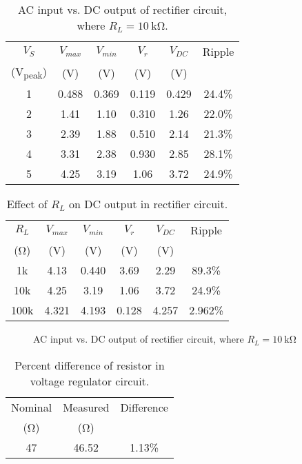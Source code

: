 \documentclass{article}
\begin{document}
\begin{table}[hbtp]
  \centering
  \begin{tabular}{cccccc}
    $V_S$           & $V_{max}$ & $V_{min}$ & $V_r$    & $V_{DC}$ & Ripple \\
    (\si{V_{peak}}) & (\si{V})  & (\si{V})  & (\si{V}) & (\si{V}) &        \\
    \hline
    1               & 0.488     & 0.369     & 0.119    & 0.429    & 24.4\% \\
    2               & 1.41      & 1.10      & 0.310    & 1.26     & 22.0\% \\
    3               & 2.39      & 1.88      & 0.510    & 2.14     & 21.3\% \\
    4               & 3.31      & 2.38      & 0.930    & 2.85     & 28.1\% \\
    5               & 4.25      & 3.19      & 1.06     & 3.72     & 24.9\% \\
  \end{tabular}
  \caption{\label{tab:rect_vp_vdc} AC input vs. DC output of rectifier circuit, where $R_L=\SI{10}{\kilo\ohm}$.}
\end{table}

\begin{table}[hbtp]
  \centering
  \begin{tabular}{cccccc}
    $R_L$       & $V_{max}$ & $V_{min}$ & $V_r$    & $V_{DC}$ & Ripple  \\
    (\si{\ohm}) & (\si{V})  & (\si{V})  & (\si{V}) & (\si{V}) &         \\
    \hline
    1k          & 4.13      & 0.440     & 3.69     & 2.29     & 89.3\%  \\
    10k         & 4.25      & 3.19      & 1.06     & 3.72     & 24.9\%  \\
    100k        & 4.321     & 4.193     & 0.128    & 4.257    & 2.962\% \\
  \end{tabular}
  \caption{\label{tab:load_v_ripple} Effect of $R_L$ on DC output in rectifier circuit.}
\end{table}

\begin{figure}[hbtp]
  \centering
  
  \caption{\label{fig:rect_vp_vdc} AC input vs. DC output of rectifier circuit, where $R_L=\SI{10}{\kilo\ohm}$}
\end{figure}

\begin{table}[hbtp]
  \centering
  \begin{tabular}{ccc}
    Nominal     & Measured    & Difference \\
    (\si{\ohm}) & (\si{\ohm}) &            \\
    \hline
    47          & 46.52       & 1.13\%     \\
  \end{tabular}
  \caption{\label{tab:res} Percent difference of resistor in voltage regulator circuit.}
\end{table}
\end{document}
